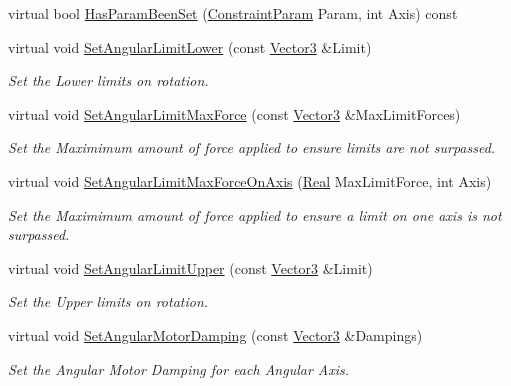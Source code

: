 \begin{DoxyCompactItemize}
virtual bool \hyperlink{classMezzanine_1_1Generic6DofConstraint_ac0589ecb2fe1e0227dbcbb52cd90ceba}{HasParamBeenSet} (\hyperlink{namespaceMezzanine_a6c62e8c2938fb203eb7a7072c12176f4}{ConstraintParam} Param, int Axis) const 
\item 
virtual void \hyperlink{classMezzanine_1_1Generic6DofConstraint_af5f946926bb5f47936dc84213b40ec95}{SetAngularLimitLower} (const \hyperlink{classMezzanine_1_1Vector3}{Vector3} \&Limit)
\begin{DoxyCompactList}\small\item\em Set the Lower limits on rotation. \item\end{DoxyCompactList}\item 
virtual void \hyperlink{classMezzanine_1_1Generic6DofConstraint_a6a0cc7ac577b855687b74583e5a23b08}{SetAngularLimitMaxForce} (const \hyperlink{classMezzanine_1_1Vector3}{Vector3} \&MaxLimitForces)
\begin{DoxyCompactList}\small\item\em Set the Maximimum amount of force applied to ensure limits are not surpassed. \item\end{DoxyCompactList}\item 
virtual void \hyperlink{classMezzanine_1_1Generic6DofConstraint_a899734922a915a2f2b22c9212f415c35}{SetAngularLimitMaxForceOnAxis} (\hyperlink{namespaceMezzanine_a726731b1a7df72bf3583e4a97282c6f6}{Real} MaxLimitForce, int Axis)
\begin{DoxyCompactList}\small\item\em Set the Maximimum amount of force applied to ensure a limit on one axis is not surpassed. \item\end{DoxyCompactList}\item 
virtual void \hyperlink{classMezzanine_1_1Generic6DofConstraint_a3bdd15929ecddb818db7fea8cfdb2fe0}{SetAngularLimitUpper} (const \hyperlink{classMezzanine_1_1Vector3}{Vector3} \&Limit)
\begin{DoxyCompactList}\small\item\em Set the Upper limits on rotation. \item\end{DoxyCompactList}\item 
virtual void \hyperlink{classMezzanine_1_1Generic6DofConstraint_ab386bb86b026ab9c1e8709b037cd9875}{SetAngularMotorDamping} (const \hyperlink{classMezzanine_1_1Vector3}{Vector3} \&Dampings)
\begin{DoxyCompactList}\small\item\em Set the Angular Motor Damping for each Angular Axis. \item\end{DoxyCompactList}\item 

\end{DoxyCompactItemize}

